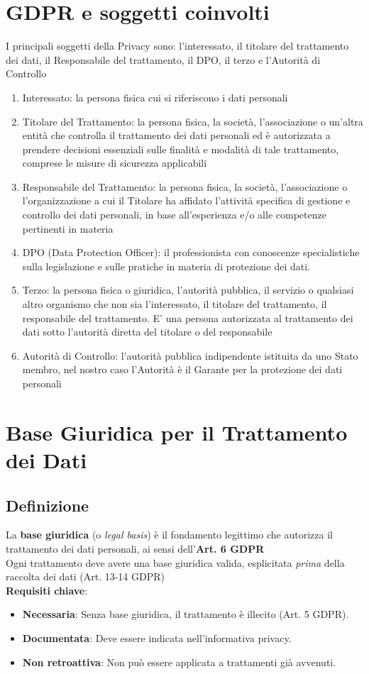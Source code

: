 \documentclass[8pt,oneside,a4paper]{article}
\begin{document}
	\section{GDPR e soggetti coinvolti}
	I  principali soggetti della Privacy sono: l’interessato, il titolare del trattamento dei dati, il Responsabile del trattamento, il DPO, il terzo e l’Autorità di Controllo
	\begin{enumerate}
		\item Interessato: la persona fisica cui si riferiscono i dati personali
		\item Titolare del Trattamento: la persona fisica, la società, l’associazione o un’altra entità che controlla il trattamento dei dati personali ed è autorizzata a prendere decisioni essenziali sulle finalità e modalità di tale trattamento, comprese le misure di sicurezza applicabili
		\item Responsabile del Trattamento: la persona fisica, la società, l’associazione o l’organizzazione a cui il Titolare ha affidato l’attività specifica di gestione e controllo dei dati personali, in base all’esperienza e/o alle competenze pertinenti in materia
		\item DPO (Data Protection Officer): il professionista con conoscenze specialistiche sulla legislazione e sulle pratiche in materia di protezione dei dati.
		\item Terzo: la persona fisica o giuridica, l’autorità pubblica, il servizio o qualsiasi altro organismo che non sia l’interessato, il titolare del trattamento, il responsabile del trattamento. E’ una persona autorizzata al trattamento dei dati sotto l’autorità diretta del titolare o del responsabile
		\item Autorità di Controllo: l’autorità pubblica indipendente istituita da uno Stato membro, nel nostro caso l’Autorità è il Garante per la protezione dei dati personali
	\end{enumerate}
	\section{Base Giuridica per il Trattamento dei Dati}
	\subsection{Definizione}
	La \textbf{base giuridica} (o \textit{legal basis}) è il fondamento legittimo che autorizza il trattamento dei dati personali, ai sensi dell’\textbf{Art. 6 GDPR}\\
	Ogni trattamento deve avere una base giuridica valida, esplicitata \textit{prima} della raccolta dei dati (Art. 13-14 GDPR)\\
	\noindent \textbf{Requisiti chiave}:
	\begin{itemize}
		\item \textbf{Necessaria}: Senza base giuridica, il trattamento è illecito (Art. 5 GDPR).
		\item \textbf{Documentata}: Deve essere indicata nell’informativa privacy.
		\item \textbf{Non retroattiva}: Non può essere applicata a trattamenti già avvenuti.
	\end{itemize}
\end{document}
